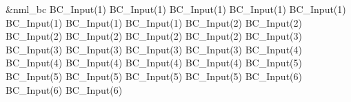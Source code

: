 \noindent\begin{minipage}{\textwidth}
\begin{nmldescitem}[%
   fontupper=\ttfamily\footnotesize%
  ,listing options={escapeinside={!@}{!@}}%
]
&nml_bc
  BC_Input(1)%
  BC_Input(1)%
  BC_Input(1)%
  BC_Input(1)%
  BC_Input(1)%
  BC_Input(1)%
  BC_Input(1)%
  BC_Input(1)%
  BC_Input(2)%
  BC_Input(2)%
  BC_Input(2)%
  BC_Input(2)%
  BC_Input(2)%
  BC_Input(2)%
  BC_Input(3)%
  BC_Input(3)%
  BC_Input(3)%
  BC_Input(3)%
  BC_Input(3)%
  BC_Input(4)%
  BC_Input(4)%
  BC_Input(4)%
  BC_Input(4)%
  BC_Input(4)%
  BC_Input(5)%
  BC_Input(5)%
  BC_Input(5)%
  BC_Input(5)%
  BC_Input(5)%
  BC_Input(6)%
  BC_Input(6)%
  BC_Input(6)%

\end{nmldescitem}
\end{minipage}
